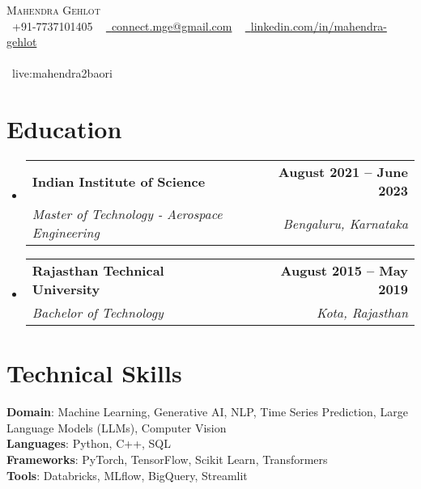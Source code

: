 \documentclass[letterpaper,11pt]{article}
\makeatletter
\newcommand{\resumeSubheading}[4]{
  \vspace{-2pt}\item
    \begin{tabular*}{1.0\textwidth}[t]{l@{\extracolsep{\fill}}r}
      \textbf{#1} & \textbf{\small #2} \\
      \textit{\small#3} & \textit{\small #4} \\
    \end{tabular*}\vspace{-7pt}
}
\newcommand{\resumeSubHeadingListStart}{\begin{itemize}[leftmargin=0.0in, label={}]}
\newcommand{\resumeSubHeadingListEnd}{\end{itemize}}
\makeatother
\begin{document}

\begin{center}
    {\Huge \scshape Mahendra Gehlot} \\ \vspace{8pt}
    \small \raisebox{-0.1\height}\faPhone\ +91-7737101405 ~ 
    \href{mailto:connect.mge@gmail.com}{\raisebox{-0.2\height}\faEnvelope\ {connect.mge@gmail.com}} ~
    \href{https://www.linkedin.com/in/mahendra-gehlot}{\raisebox{-0.2\height}\faLinkedin\ {linkedin.com/in/mahendra-gehlot}}  ~ 
    \vspace{4pt}
    \\\\{\faSkype\ {live:mahendra2baori}} ~
    \href{https://github.com/mahendra-gehlot}{\raisebox{-0.2\height}}  ~ 
    \vspace{-12pt}
\end{center}

\section{Education}
  \resumeSubHeadingListStart
    \resumeSubheading
      {Indian Institute of Science}{August 2021 -- June 2023}
      {Master of Technology - Aerospace Engineering}{Bengaluru, Karnataka}
    \resumeSubHeadingListEnd
    \resumeSubHeadingListStart
    \resumeSubheading
      {Rajasthan Technical University}{August 2015 -- May 2019}
      {Bachelor of Technology}{Kota, Rajasthan}
    \resumeSubHeadingListEnd

\section{Technical Skills}
 \begin{itemize}[leftmargin=0.15in, label={}]
    \small{\item{
    \textbf{Domain}{: Machine Learning, Generative AI, NLP, Time Series Prediction, Large Language Models (LLMs), Computer Vision} \\
     \vspace{4pt}
     \textbf{Languages}{: Python, C++, SQL} \\
     \vspace{4pt}
     \textbf{Frameworks}{: PyTorch, TensorFlow, Scikit Learn, Transformers} \\
     \vspace{4pt}
     \textbf{Tools}{: Databricks, MLflow, BigQuery, Streamlit} \\
    }}
 \end{itemize}
\end{document}
